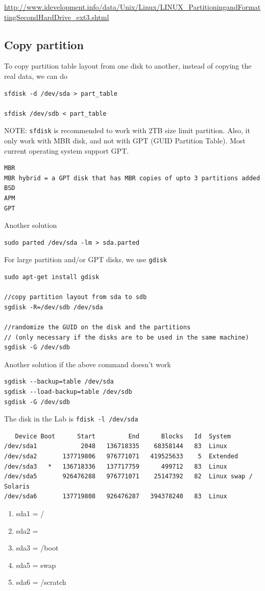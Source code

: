 \url{http://www.idevelopment.info/data/Unix/Linux/LINUX_PartitioningandFormattingSecondHardDrive_ext3.shtml}

\subsection{Copy partition}

To copy partition table layout from one disk to another, instead of copying the
real data, we can do
\begin{verbatim}
sfdisk -d /dev/sda > part_table

sfdisk /dev/sdb < part_table
\end{verbatim}
NOTE: \verb!sfdisk! is recommended to work with 2TB size limit partition. Also,
it only work with MBR disk, and not with GPT (GUID Partition Table). Most
current operating system support GPT. 
\begin{verbatim}
MBR
MBR hybrid = a GPT disk that has MBR copies of upto 3 partitions added
BSD
APM
GPT
\end{verbatim}

Another solution
\begin{verbatim}
sudo parted /dev/sda -lm > sda.parted 
\end{verbatim}

For large partition and/or GPT disks, we use \verb!gdisk!
\begin{verbatim}
sudo apt-get install gdisk

//copy partition layout from sda to sdb
sgdisk -R=/dev/sdb /dev/sda

//randomize the GUID on the disk and the partitions
// (only necessary if the disks are to be used in the same machine)
sgdisk -G /dev/sdb
\end{verbatim}

Another solution if the above command doesn't work
\begin{verbatim}
sgdisk --backup=table /dev/sda
sgdisk --load-backup=table /dev/sdb
sgdisk -G /dev/sdb
\end{verbatim}

The disk in the Lab is \verb!fdisk -l /dev/sda!
\begin{verbatim}
   Device Boot      Start         End      Blocks   Id  System
/dev/sda1            2048   136718335    68358144   83  Linux
/dev/sda2       137719806   976771071   419525633    5  Extended
/dev/sda3   *   136718336   137717759      499712   83  Linux
/dev/sda5       926476288   976771071    25147392   82  Linux swap / Solaris
/dev/sda6       137719808   926476287   394378240   83  Linux
\end{verbatim}
\begin{enumerate}
  \item sda1 = /
  \item sda2 = 
  \item sda3 = /boot
  \item sda5 = swap
  \item sda6 = /scratch
\end{enumerate}

